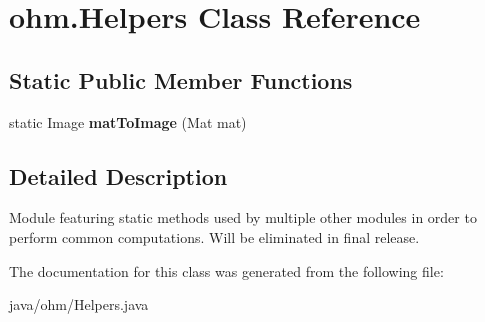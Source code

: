 \hypertarget{classohm_1_1_helpers}{}\section{ohm.\+Helpers Class Reference}
\label{classohm_1_1_helpers}
\subsection*{Static Public Member Functions}
\begin{DoxyCompactItemize}
\item 
\hypertarget{classohm_1_1_helpers_a1152a5e4b9a5206d82e72033dbb1ff19}{}\label{classohm_1_1_helpers_a1152a5e4b9a5206d82e72033dbb1ff19} 
static Image {\bfseries mat\+To\+Image} (Mat mat)
\end{DoxyCompactItemize}


\subsection{Detailed Description}
Module featuring static methods used by multiple other modules in order to perform common computations. Will be eliminated in final release. 

The documentation for this class was generated from the following file\+:\begin{DoxyCompactItemize}
\item 
java/ohm/Helpers.\+java\end{DoxyCompactItemize}
